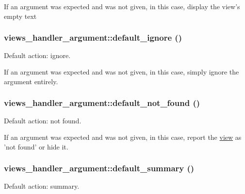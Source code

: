 If an argument was expected and was not given, in this case, display the view's empty text \hypertarget{classviews__handler__argument_add70e34213524feae0efaf05235ef60e}{
\subsubsection[{default\_\-ignore}]{\setlength{\rightskip}{0pt plus 5cm}views\_\-handler\_\-argument::default\_\-ignore ()}}
\label{classviews__handler__argument_add70e34213524feae0efaf05235ef60e}
Default action: ignore.

If an argument was expected and was not given, in this case, simply ignore the argument entirely. \hypertarget{classviews__handler__argument_a86d899382f0c2cb16177d18b553827af}{
\subsubsection[{default\_\-not\_\-found}]{\setlength{\rightskip}{0pt plus 5cm}views\_\-handler\_\-argument::default\_\-not\_\-found ()}}
\label{classviews__handler__argument_a86d899382f0c2cb16177d18b553827af}
Default action: not found.

If an argument was expected and was not given, in this case, report the \hyperlink{classview}{view} as 'not found' or hide it. \hypertarget{classviews__handler__argument_aa4516957f112b54119015119da20ff1c}{
\subsubsection[{default\_\-summary}]{\setlength{\rightskip}{0pt plus 5cm}views\_\-handler\_\-argument::default\_\-summary ()}}
\label{classviews__handler__argument_aa4516957f112b54119015119da20ff1c}
Default action: summary.

